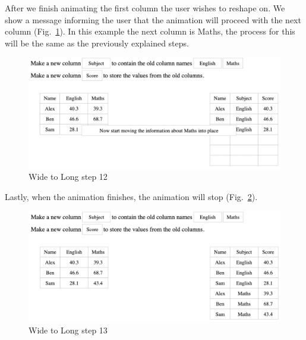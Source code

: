 After we finish animating the first column the user wishes to reshape on. We show a message informing the user that the animation will proceed with the next column (Fig.~\ref{fig:gather12}). In this example the next column is Maths, the process for this will be the same as the previously explained steps.
\begin{figure}[H]
    \includegraphics[scale = 0.35]{Masters-Thesis/img/gather12.png}
    \caption{Wide to Long step 12}
    \label{fig:gather12}
\end{figure}

\newpage

Lastly, when the animation finishes, the animation will stop (Fig.~\ref{fig:gather13}).

\begin{figure}[H]
    \includegraphics[scale = 0.35]{Masters-Thesis/img/gather13.png}
    \caption{Wide to Long step 13}
    \label{fig:gather13}
\end{figure}